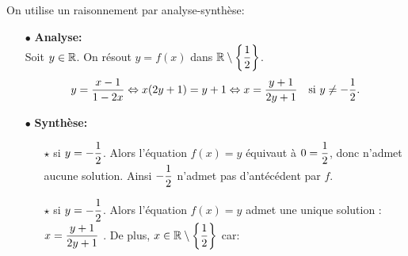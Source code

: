 \documentclass[a4paper, 11pt,reqno]{article}
\begin{document}
\begin{correction}
	On utilise un raisonnement par analyse-synth\`{e}se:
	\begin{itemize}
		\item[$\bullet$] \textbf{Analyse:}\\
			\noindent Soit $y\in\mathbb{R}$. On r\'esout $y=f(x)$ dans $\mathbb{R}\setminus\left\lbrace \displaystyle\frac{1}{2}\right\rbrace$.
			$$y=\ddp\frac{x-1}{1-2x}\Leftrightarrow x(2y+1)=y+1\Leftrightarrow x=\ddp\frac{y+1}{2y+1}\quad\hbox{si}\ y\not=-\ddp\demi.$$
		\item[$\bullet$]  \textbf{Synth\`ese:}\\
			\begin{itemize}
				\item[$\star$] si $y = -\displaystyle\frac{1}{2}$. Alors l'\'equation $f(x)=y$ \'equivaut \`a $0=\displaystyle\frac{1}{2}$, donc n'admet aucune solution. Ainsi $\displaystyle -\frac{1}{2}$ n'admet pas d'ant\'ec\'edent par $f$.
				\item[$\star$] si $y = -\displaystyle\frac{1}{2}$. Alors l'\'equation $f(x)=y$ admet une unique solution :$x=\displaystyle\frac{y+1}{2y+1}$ . De plus, $x\in\mathbb{R}\setminus\left\lbrace \displaystyle\frac{1}{2}\right\rbrace$ car:

\end{itemize}
\end{itemize}
\end{correction}
\end{document}
